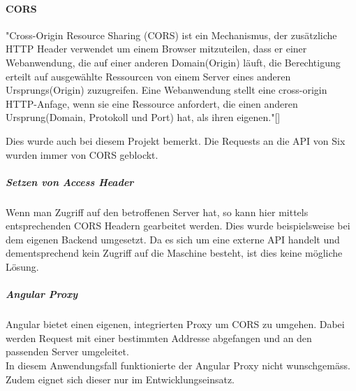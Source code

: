 \paragraph{CORS}\label{CORS}
"Cross-Origin Resource Sharing (CORS) ist ein Mechanismus, der zusätzliche HTTP Header verwendet um einem Browser mitzuteilen, dass er einer Webanwendung, die auf einer anderen Domain(Origin) läuft, die Berechtigung erteilt auf ausgewählte Ressourcen von einem Server eines anderen Ursprungs(Origin) zuzugreifen. Eine Webanwendung stellt eine cross-origin HTTP-Anfage, wenn sie eine Ressource anfordert, die einen anderen Ursprung(Domain, Protokoll und Port) hat, als ihren eigenen."[\cite{cors}]

Dies wurde auch bei diesem Projekt bemerkt. Die Requests an die API von Six wurden immer von \ac{CORS} geblockt. 

\subparagraph{Setzen von Access Header}
Wenn man Zugriff auf den betroffenen Server hat, so kann hier mittels entsprechenden CORS Headern gearbeitet werden. Dies wurde beispielsweise bei dem eigenen Backend umgesetzt. Da es sich um eine externe API handelt und dementsprechend kein Zugriff auf die Maschine besteht, ist dies keine mögliche Lösung. 

\subparagraph{Angular Proxy}
Angular bietet einen eigenen, integrierten Proxy um \ac{CORS} zu umgehen. Dabei werden Request mit einer bestimmten Addresse abgefangen und an den passenden Server umgeleitet.\\
In diesem Anwendungsfall funktionierte der Angular Proxy nicht wunschgemäss. Zudem eignet sich dieser nur im Entwicklungseinsatz. 

